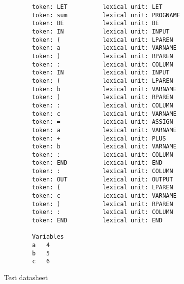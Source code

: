     \begin{verbatim}
		token: LET        	lexical unit: LET
		token: sum        	lexical unit: PROGNAME
		token: BE         	lexical unit: BE
		token: IN         	lexical unit: INPUT
		token: (          	lexical unit: LPAREN
		token: a          	lexical unit: VARNAME
		token: )          	lexical unit: RPAREN
		token: :          	lexical unit: COLUMN
		token: IN         	lexical unit: INPUT
		token: (          	lexical unit: LPAREN
		token: b          	lexical unit: VARNAME
		token: )          	lexical unit: RPAREN
		token: :          	lexical unit: COLUMN
		token: c          	lexical unit: VARNAME
		token: =          	lexical unit: ASSIGN
		token: a          	lexical unit: VARNAME
		token: +          	lexical unit: PLUS
		token: b          	lexical unit: VARNAME
		token: :          	lexical unit: COLUMN
		token: END        	lexical unit: END
		token: :          	lexical unit: COLUMN
		token: OUT        	lexical unit: OUTPUT
		token: (          	lexical unit: LPAREN
		token: c          	lexical unit: VARNAME
		token: )          	lexical unit: RPAREN
		token: :          	lexical unit: COLUMN
		token: END        	lexical unit: END

		Variables
		a	4
		b	5
		c	6
	\end{verbatim}

    \begin{table}[h]
		\centering
		\caption{Test datasheet}
	\end{table}